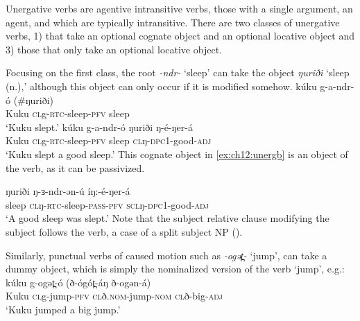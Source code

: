 Unergative verbs are agentive intransitive verbs, those with a single argument, an agent, and which are typically intransitive. There are two classes of unergative verbs, 1) that take an optional cognate object and an optional locative object and 3) those that only take an optional locative object. 

Focusing on the first class, the root \textit{-ndr-} `sleep' can take the object \textit{ŋuriði} `sleep (n.),' although this object can only occur if it is modified somehow.
\ea 
	\ea	\gll   kúku g-a-ndr-ó (\#ŋuriði)\\
		Kuku \textsc{cl}g-\textsc{rtc}-sleep-\textsc{pfv} sleep\\
		\glt `Kuku slept.'
	\ex	\gll   kúku g-a-ndr-ó ŋuriði ŋ-é-ŋer-á\\
		Kuku \textsc{cl}g-\textsc{rtc}-sleep-\textsc{pfv} sleep \textsc{cl}ŋ-\textsc{dpc1}-good-\textsc{adj}\\
		\glt `Kuku slept a good sleep.'\label{ex:ch12:unergb}
	\z
\z 
This cognate object in \ref{ex:ch12:unergb} is an object of the verb, as it can be passivized.

\ea	\gll   ŋuriði ŋ-ɜ-ndr-ən-ú  íŋ:-é-ŋer-á\\
		sleep \textsc{cl}ŋ-\textsc{rtc}-sleep-\textsc{pass-pfv} \textsc{scl}ŋ-\textsc{dpc1}-good-\textsc{adj}\\
		\glt `A good sleep was slept.'
\z 
Note that the subject relative clause modifying the subject follows the verb, a case of a split subject NP (). 

Similarly, punctual verbs of caused motion such as \textit{-ogət̪-} `jump', can take a dummy object, which is simply the nominalized version of the verb `jump', e.g.:
\ea	
	\gll	kúku g-ogət̪-ó (ð-ógót̪-áŋ ð-ogən-á)\\
			Kuku \textsc{cl}g-jump-\textsc{pfv} \textsc{cl}ð.\textsc{nom}-jump-\textsc{nom} \textsc{cl}ð-big-\textsc{adj}\\
	\glt 	`Kuku jumped a big jump.'
\z %


